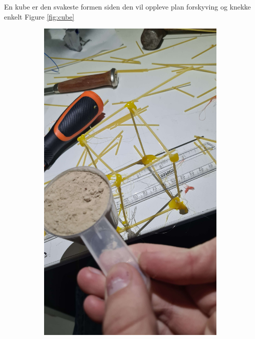 \documentclass{report}
\newcommand{\subimgw}{.5\linewidth}
\begin{document}
En kube er den svakeste formen siden den vil oppleve plan forskyving og knekke enkelt Figure \ref{fig:cube}

\begin{figure}[H]
	\begin{subfigure}{.5\textwidth}
		\centering
		\includegraphics[width=\subimgw]{cube-a}


\end{subfigure}
\end{figure}
\end{document}
